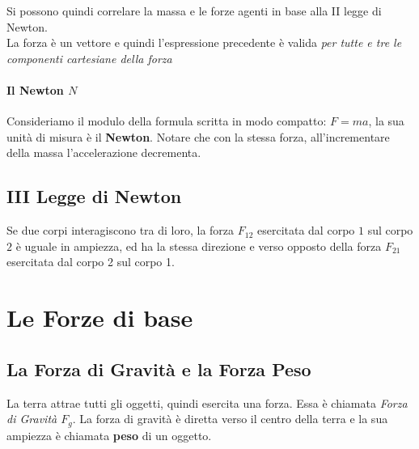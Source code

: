 \documentclass[12pt, a4paper, openany]{book}
\begin{document}
Si possono quindi correlare la massa e le forze agenti in base alla II legge di Newton.\\
La forza è un vettore e quindi l'espressione precedente è valida \emph{per tutte e tre le componenti cartesiane della forza}

\paragraph*{Il Newton $N$}
Consideriamo il modulo della formula scritta in modo compatto: $F=ma$, la sua unità di misura è il \textbf{Newton}.
Notare che con la stessa forza, all'incrementare della massa l'accelerazione decrementa.

\subsection{III Legge di Newton}
Se due corpi interagiscono tra di loro, la forza $F_{12}$ esercitata dal corpo $1$ sul corpo $2$ è uguale in ampiezza,
ed ha la stessa direzione e verso opposto della forza $F_{21}$ esercitata dal corpo 2 sul corpo 1.
\section{Le Forze di base}
\subsection{La Forza di Gravità e la Forza Peso}
La terra attrae tutti gli oggetti, quindi esercita una forza. Essa è chiamata \emph{Forza di Gravità $F_g$}.
La forza di gravità è diretta verso il centro della terra e la sua ampiezza è chiamata \textbf{peso} di un oggetto.
\end{document}
